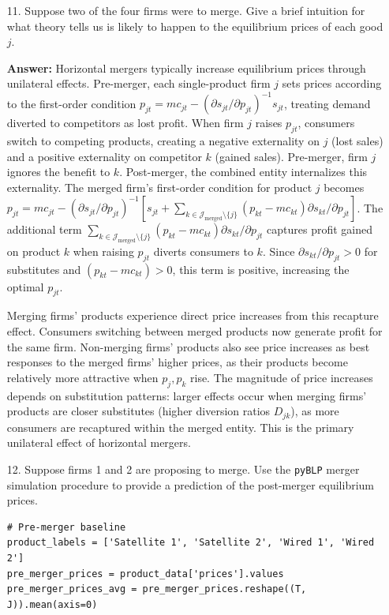 \documentclass[english,11pt]{article}
\begin{document}
\begin{enumerate}
\item[11.] Suppose two of the four firms were to merge. Give a brief
intuition for what theory tells us is likely to happen to the equilibrium
prices of each good $j$.

\textbf{Answer:}
Horizontal mergers typically increase equilibrium prices through unilateral effects. Pre-merger, each single-product firm $j$ sets prices according to the first-order condition $p_{jt} = mc_{jt} - (\partial s_{jt}/\partial p_{jt})^{-1} s_{jt}$, treating demand diverted to competitors as lost profit. When firm $j$ raises $p_{jt}$, consumers switch to competing products, creating a negative externality on $j$ (lost sales) and a positive externality on competitor $k$ (gained sales). Pre-merger, firm $j$ ignores the benefit to $k$. Post-merger, the combined entity internalizes this externality. The merged firm's first-order condition for product $j$ becomes $p_{jt} = mc_{jt} - (\partial s_{jt}/\partial p_{jt})^{-1} [s_{jt} + \sum_{k \in \mathcal{J}_{\text{merged}} \setminus \{j\}} (p_{kt} - mc_{kt}) \partial s_{kt}/\partial p_{jt}]$. The additional term $\sum_{k \in \mathcal{J}_{\text{merged}} \setminus \{j\}} (p_{kt} - mc_{kt}) \partial s_{kt}/\partial p_{jt}$ captures profit gained on product $k$ when raising $p_{jt}$ diverts consumers to $k$. Since $\partial s_{kt}/\partial p_{jt} > 0$ for substitutes and $(p_{kt} - mc_{kt}) > 0$, this term is positive, increasing the optimal $p_{jt}$.

Merging firms' products experience direct price increases from this recapture effect. Consumers switching between merged products now generate profit for the same firm. Non-merging firms' products also see price increases as best responses to the merged firms' higher prices, as their products become relatively more attractive when $p_j, p_k$ rise. The magnitude of price increases depends on substitution patterns: larger effects occur when merging firms' products are closer substitutes (higher diversion ratios $D_{jk}$), as more consumers are recaptured within the merged entity. This is the primary unilateral effect of horizontal mergers.

\item[12.] Suppose firms 1 and 2 are proposing to merge. Use the \texttt{pyBLP}
merger simulation procedure to provide a prediction of the post-merger
equilibrium prices.

\begin{verbatim}
# Pre-merger baseline
product_labels = ['Satellite 1', 'Satellite 2', 'Wired 1', 'Wired 2']
pre_merger_prices = product_data['prices'].values
pre_merger_prices_avg = pre_merger_prices.reshape((T, J)).mean(axis=0)


\end{verbatim}
\end{enumerate}
\end{document}
